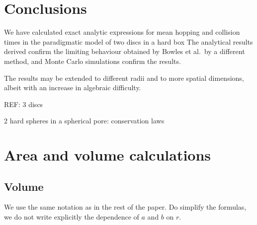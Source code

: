 \documentclass[superscriptaddress,pre,reprint,showpacs,onecolumn]{revtex4-1}
\newcommand{\etal}{et al.\ }
\begin{document}
\section{Conclusions}

We have calculated exact analytic expressions for mean hopping and
collision times in the paradigmatic model of two discs in a hard box
The analytical results derived 
confirm the limiting behaviour obtained
by Bowles \etal by a different method, and Monte Carlo simulations confirm 
the results. 

The results may be extended to different radii and to more spatial dimensions, albeit
with an increase in algebraic difficulty.



REF: 3 discs

2 hard spheres in a spherical pore: conservation laws

\appendix
\section{Area and volume calculations}
\label{app:area_volume}

\subsection{Volume}\label{VolApen}

We use the same notation as in the rest of the paper.
Do simplify the formulas, we do not write explicitly the dependence of $a$ and $b$ on $r$.
\end{document}
